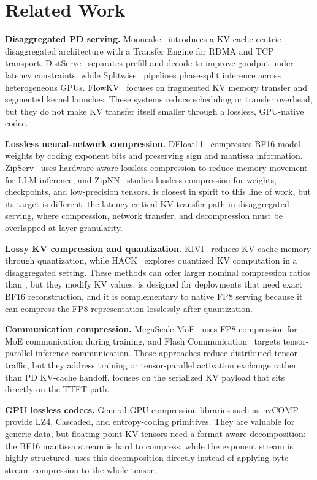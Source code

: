 \section{Related Work}
\label{sec:related}

\textbf{Disaggregated PD serving.}
Mooncake~\cite{mooncake} introduces a KV-cache-centric disaggregated architecture with a Transfer Engine for RDMA and TCP transport.
DistServe~\cite{distserve} separates prefill and decode to improve goodput under latency constraints, while Splitwise~\cite{splitwise} pipelines phase-split inference across heterogeneous GPUs.
FlowKV~\cite{flowkv} focuses on fragmented KV memory transfer and segmented kernel launches.
These systems reduce scheduling or transfer overhead, but they do not make KV transfer itself smaller through a lossless, GPU-native codec.

\textbf{Lossless neural-network compression.}
DFloat11~\cite{dfloat11} compresses BF16 model weights by coding exponent bits and preserving sign and mantissa information.
ZipServ~\cite{zipserv} uses hardware-aware lossless compression to reduce memory movement for LLM inference, and ZipNN~\cite{zipnn} studies lossless compression for weights, checkpoints, and low-precision tensors.
\splitzip is closest in spirit to this line of work, but its target is different: the latency-critical KV transfer path in disaggregated serving, where compression, network transfer, and decompression must be overlapped at layer granularity.

\textbf{Lossy KV compression and quantization.}
KIVI~\cite{kivi} reduces KV-cache memory through quantization, while HACK~\cite{hack} explores quantized KV computation in a disaggregated setting.
These methods can offer larger nominal compression ratios than \splitzip, but they modify KV values.
\splitzip is designed for deployments that need exact BF16 reconstruction, and it is complementary to native FP8 serving because it can compress the FP8 representation losslessly after quantization.

\textbf{Communication compression.}
MegaScale-MoE~\cite{megascalemoe} uses FP8 compression for MoE communication during training, and Flash Communication~\cite{flashcomm} targets tensor-parallel inference communication.
Those approaches reduce distributed tensor traffic, but they address training or tensor-parallel activation exchange rather than PD KV-cache handoff.
\splitzip focuses on the serialized KV payload that sits directly on the TTFT path.

\textbf{GPU lossless codecs.}
General GPU compression libraries such as nvCOMP provide LZ4, Cascaded, and entropy-coding primitives.
They are valuable for generic data, but floating-point KV tensors need a format-aware decomposition: the BF16 mantissa stream is hard to compress, while the exponent stream is highly structured.
\splitzip uses this decomposition directly instead of applying byte-stream compression to the whole tensor.

